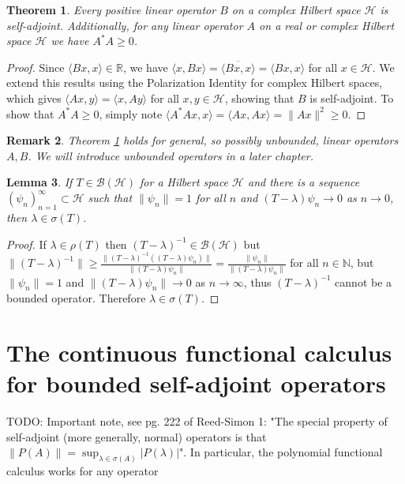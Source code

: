 \documentclass[12pt,oneside]{report}
\newtheorem{thm}{Theorem}[chapter]
\newtheorem{lem}[thm]{Lemma}
\newtheorem{rem}[thm]{Remark}
\begin{document}
\begin{thm}\label{pos-selfadj}
    Every positive linear operator $B$ on a complex Hilbert space $\mathscr{H}$ is self-adjoint. Additionally, for any linear operator $A$ on a real or complex Hilbert space $\mathscr{H}$ we have $A^{*}A \geq 0$.
\end{thm}
\begin{proof}
    Since $\langle Bx, x \rangle \in \mathbb{R}$, we have $\langle x, Bx \rangle = \overline{\langle Bx, x \rangle} = \langle Bx, x \rangle$ for all $x \in \mathscr{H}$. We extend this results using the Polarization Identity for complex Hilbert spaces, which gives $\langle Ax, y \rangle = \langle x, Ay \rangle$ for all $x,y \in \mathscr{H}$, showing that $B$ is self-adjoint. To show that $A^{*}A \geq 0$, simply note $\langle A^{*}Ax,x \rangle = \langle Ax, Ax \rangle = \|Ax\|^{2} \geq 0$.
\end{proof}

\begin{rem}
    Theorem \ref{pos-selfadj} holds for general, so possibly unbounded, linear operators $A,B$. We will introduce unbounded operators in a later chapter.
\end{rem}

\begin{lem}
    If $T \in \mathscr{B}(\mathscr{H})$ for a Hilbert space $\mathscr{H}$ and there is a sequence $(\psi_{n})_{n=1}^{\infty} \subset \mathscr{H}$ such that $\|\psi_{n}\| = 1$ for all $n$ and $(T-\lambda)\psi_{n} \to 0$ as $n \to 0$, then $\lambda \in \sigma(T)$.
\end{lem}
\begin{proof}
    If $\lambda \in \rho(T)$ then $(T - \lambda)^{-1} \in \mathscr{B}(\mathscr{H})$ but $\|(T - \lambda)^{-1}\| \geq \frac{\|(T - \lambda)^{-1}((T - \lambda)\psi_{n})\|}{\|(T-\lambda)\psi_{n}\|} = \frac{\|\psi_{n}\|}{\|(T-\lambda)\psi_{n}\|}$ for all $n \in \mathbb{N}$, but $\|\psi_{n}\| = 1$ and $\|(T-\lambda)\psi_{n}\| \to 0$ as $n \to \infty$, thus $(T-\lambda)^{-1}$ cannot be a bounded operator. Therefore $\lambda \in \sigma(T)$.
\end{proof}

\chapter{The continuous functional calculus for bounded self-adjoint operators}

TODO: Important note, see pg. 222 of Reed-Simon 1: "The special property of self-adjoint (more generally, normal) operators is that $\|P(A)\| = \sup_{\lambda \in \sigma(A)}|P(\lambda)|$". In particular, the polynomial functional calculus works for any operator
\end{document}
